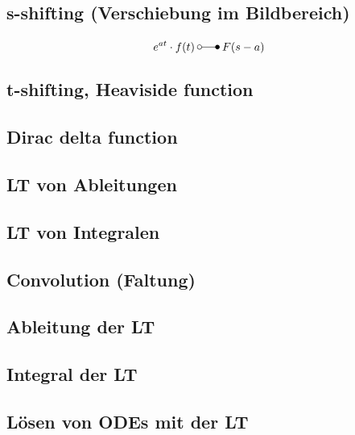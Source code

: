 \subsection{s-shifting (Verschiebung im Bildbereich)}
\begin{equation*}
    e^{at}\cdot f(t)\:\laplace\:F(s-a)
\end{equation*}

\subsection{t-shifting, Heaviside function}
\subsection{Dirac delta function}
\subsection{LT von Ableitungen}
\subsection{LT von Integralen}
\subsection{Convolution (Faltung)}
\subsection{Ableitung der LT}
\subsection{Integral der LT}
\subsection{Lösen von ODEs mit der LT}

